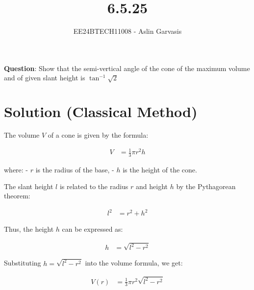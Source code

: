 \documentclass[journal]{IEEEtran}
\begin{document}
	

\vspace{3cm}
	
\title{6.5.25}
\author{EE24BTECH11008 - Aslin Garvasis}
{\let\newpage\relax\maketitle}
	
\renewcommand{\thefigure}{\theenumi}
\renewcommand{\thetable}{\theenumi}
\setlength{\intextsep}{10pt} %
	
	
\renewcommand{\thetable}{\theenumi}
	
	
\textbf{Question}:\newline
Show that the semi-vertical angle of the cone of the maximum volume and of given slant height is $\tan^{-1}\sqrt{2}$ \\


\section*{Solution (Classical Method)}

The volume \( V \) of a cone is given by the formula:

\begin{align}
V &= \frac{1}{3} \pi r^2 h
\end{align}

where:
- \( r \) is the radius of the base,
- \( h \) is the height of the cone.

The slant height \( l \) is related to the radius \( r \) and height \( h \) by the Pythagorean theorem:

\begin{align}
l^2 &= r^2 + h^2
\end{align}

Thus, the height \( h \) can be expressed as:

\begin{align}
h &= \sqrt{l^2 - r^2}
\end{align}

Substituting \( h = \sqrt{l^2 - r^2} \) into the volume formula, we get:

\begin{align}
V(r) &= \frac{1}{3} \pi r^2 \sqrt{l^2 - r^2}
\end{align}
\end{document}
